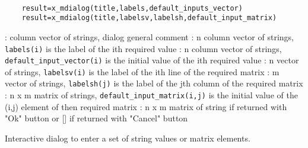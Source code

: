 
\begin{mandesc}
   \\ %
\end{mandesc}
\label{x-mdialog}
\begin{calling_sequence}
  \begin{verbatim}
    result=x_mdialog(title,labels,default_inputs_vector)   
    result=x_mdialog(title,labelsv,labelsh,default_input_matrix)   
  \end{verbatim}
\end{calling_sequence}

\begin{parameters}
  \begin{varlist}
     : column vector of strings, dialog general comment
     : n column vector of strings, \verb!labels(i)! is the label of  the ith required value
     : n  column vector of strings, \verb!default_input_vector(i)! is the initial 
    value of  the ith required value
     : n  vector of strings, \verb!labelsv(i)! is the label of  the ith line of the required matrix
     : m  vector of strings, \verb!labelsh(j)! is the label of  the jth column of the required matrix
     : n x m matrix of strings, \verb!default_input_matrix(i,j)! is the initial value of the (i,j) element of then required matrix
     : n x m matrix of string if returned with "Ok" button or [] if returned with "Cancel" button
  \end{varlist}
\end{parameters}
\begin{mandescription}
  Interactive dialog to enter a set of string values or matrix elements.
\end{mandescription}
\begin{examples}
  \begin{program}
  \end{program}
\end{examples}
\begin{manseealso}
\end{manseealso}


